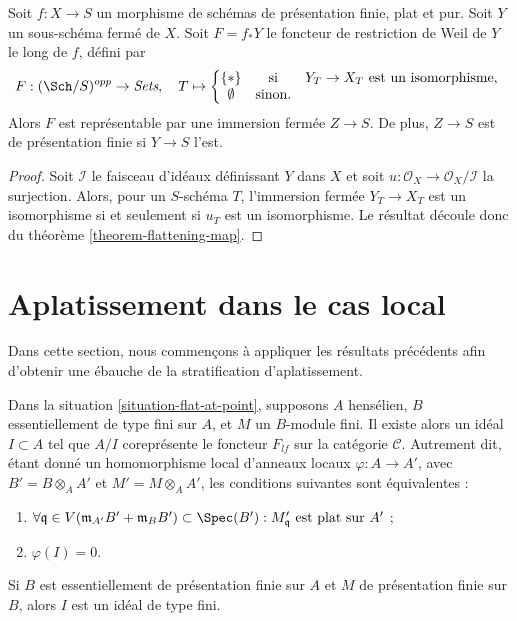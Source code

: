 \begin{lemma}
\label{lemma-Weil-restriction-closed-subschemes}
Soit $f:X\to S$ un morphisme de schémas de présentation finie,
plat et pur. Soit $Y$ un sous-schéma fermé de $X$. Soit $F=f_*Y$ le
foncteur de restriction de Weil de $Y$ le long de $f$, défini par
$$
F : (\Sch/S)^{opp} \to \textit{Sets}, \quad
T \mapsto
\left\{
\begin{matrix}
\{*\} & \text{si} & Y_T\to X_T \text{ est un isomorphisme, }\\
\emptyset & \text{sinon.} &
\end{matrix}
\right.
$$
Alors $F$ est représentable par une immersion fermée $Z\to S$. De plus,
$Z\to S$ est de présentation finie si $Y\to S$ l'est.
\end{lemma}

\begin{proof}
Soit $\mathcal{I}$ le faisceau d'idéaux définissant $Y$ dans $X$ et soit
$u:\mathcal{O}_X\to\mathcal{O}_X/\mathcal{I}$ la surjection.
Alors, pour un $S$-schéma $T$, l'immersion fermée $Y_T\to X_T$
est un isomorphisme si et seulement si $u_T$ est un isomorphisme. Le résultat
découle donc du
théorème \ref{theorem-flattening-map}.
\end{proof}



\section{Aplatissement dans le cas local}
\label{section-flattening-local}

\noindent
Dans cette section, nous commençons à appliquer les résultats précédents afin d'obtenir une
ébauche de la stratification d'aplatissement.

\begin{theorem}
\label{theorem-flattening-local}
Dans la
situation \ref{situation-flat-at-point},
supposons $A$ hensélien, $B$ essentiellement de type fini sur $A$, et
$M$ un $B$-module fini. Il existe alors un idéal
$I \subset A$ tel que $A/I$ coreprésente le foncteur $F_{lf}$ sur la catégorie
$\mathcal{C}$. Autrement dit, étant donné un homomorphisme local d'anneaux locaux
$\varphi : A \to A'$, avec $B' = B \otimes_A A'$ et $M' = M \otimes_A A'$,
les conditions suivantes sont équivalentes :
\begin{enumerate}
\item $\forall \mathfrak q \in V(\mathfrak m_{A'}B' + \mathfrak m_B B')
\subset \Spec(B') :
M'_{\mathfrak q}\text{ est plat sur }A'$ ;
\item $\varphi(I) = 0$.
\end{enumerate}
Si $B$ est essentiellement de présentation finie sur $A$ et $M$
de présentation finie sur $B$, alors $I$ est un idéal de type fini.
\end{theorem}

